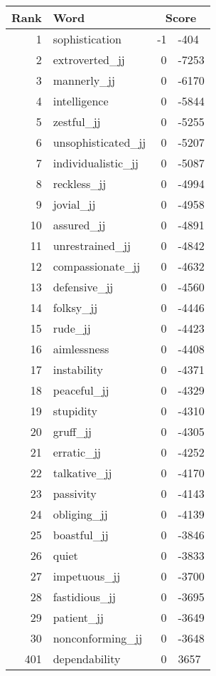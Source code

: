 \begin{longtable}[!htbp]{| rlr@{.}l |}
    \hline
    \textbf{Rank} & \textbf{Word} & \multicolumn{2}{c|}{\textbf{Score}} \\
    \hline
    \endhead
    1 & sophistication & -1 & -404 \\
    2 & extroverted\_jj & 0 & -7253 \\
    3 & mannerly\_jj & 0 & -6170 \\
    4 & intelligence & 0 & -5844 \\
    5 & zestful\_jj & 0 & -5255 \\
    6 & unsophisticated\_jj & 0 & -5207 \\
    7 & individualistic\_jj & 0 & -5087 \\
    8 & reckless\_jj & 0 & -4994 \\
    9 & jovial\_jj & 0 & -4958 \\
    10 & assured\_jj & 0 & -4891 \\
    11 & unrestrained\_jj & 0 & -4842 \\
    12 & compassionate\_jj & 0 & -4632 \\
    13 & defensive\_jj & 0 & -4560 \\
    14 & folksy\_jj & 0 & -4446 \\
    15 & rude\_jj & 0 & -4423 \\
    16 & aimlessness & 0 & -4408 \\
    17 & instability & 0 & -4371 \\
    18 & peaceful\_jj & 0 & -4329 \\
    19 & stupidity & 0 & -4310 \\
    20 & gruff\_jj & 0 & -4305 \\
    21 & erratic\_jj & 0 & -4252 \\
    22 & talkative\_jj & 0 & -4170 \\
    23 & passivity & 0 & -4143 \\
    24 & obliging\_jj & 0 & -4139 \\
    25 & boastful\_jj & 0 & -3846 \\
    26 & quiet & 0 & -3833 \\
    27 & impetuous\_jj & 0 & -3700 \\
    28 & fastidious\_jj & 0 & -3695 \\
    29 & patient\_jj & 0 & -3649 \\
    30 & nonconforming\_jj & 0 & -3648 \\
    401 & dependability & 0 & 3657 \\

\end{longtable}
